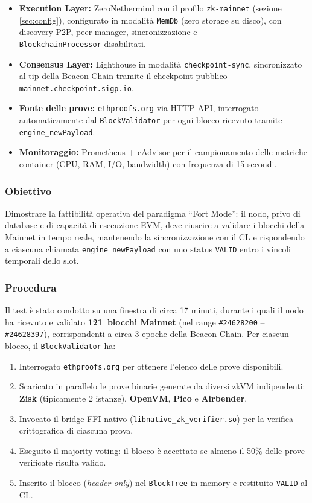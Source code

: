 \documentclass[12pt,a4paper,openright,twoside]{report}
\begin{document}
\begin{itemize}
    \item \textbf{Execution Layer:} ZeroNethermind con il profilo \texttt{zk-mainnet} (sezione \ref{sec:config}), configurato in modalità \texttt{MemDb} (zero storage su disco), con discovery P2P, peer manager, sincronizzazione e \\\texttt{BlockchainProcessor} disabilitati.
    \item \textbf{Consensus Layer:} Lighthouse in modalità \texttt{checkpoint-sync}, sincronizzato al tip della Beacon Chain tramite il checkpoint pubblico \texttt{mainnet.checkpoint.sigp.io}.
    \item \textbf{Fonte delle prove:} \texttt{ethproofs.org} via HTTP API, interrogato automaticamente dal \texttt{BlockValidator} per ogni blocco ricevuto tramite \texttt{engine\_newPayload}.
    \item \textbf{Monitoraggio:} Prometheus\cite{prometheus} + cAdvisor\cite{cAdvisor} per il campionamento delle metriche container (CPU, RAM, I/O, bandwidth) con frequenza di 15 secondi.
\end{itemize}

\subsubsection{Obiettivo}

Dimostrare la fattibilità operativa del paradigma ``Fort Mode'': il nodo, privo di database e di capacità di esecuzione EVM, deve riuscire a validare i blocchi della Mainnet in tempo reale, mantenendo la sincronizzazione con il CL e rispondendo a ciascuna chiamata \texttt{engine\_newPayload} con uno status \texttt{VALID} entro i vincoli temporali dello slot.

\subsubsection{Procedura}

Il test è stato condotto su una finestra di circa 17 minuti, durante i quali il nodo ha ricevuto e validato \textbf{121~blocchi Mainnet} (nel range \texttt{\#24628200} -- \texttt{\#24628397}), corrispondenti a circa 3 epoche della Beacon Chain. Per ciascun blocco, il \texttt{BlockValidator} ha:

\begin{enumerate}
    \item Interrogato \texttt{ethproofs.org} per ottenere l'elenco delle prove disponibili.
    \item Scaricato in parallelo le prove binarie generate da diversi zkVM indipendenti: \textbf{Zisk} (tipicamente 2 istanze), \textbf{OpenVM}, \textbf{Pico} e \textbf{Airbender}.
    \item Invocato il bridge FFI nativo (\texttt{libnative\_zk\_verifier.so}) per la verifica crittografica di ciascuna prova.
    \item Eseguito il majority voting: il blocco è accettato se almeno il 50\% delle prove verificate risulta valido.
    \item Inserito il blocco (\textit{header-only}) nel \texttt{BlockTree} in-memory e restituito \texttt{VALID} al CL.
\end{enumerate}
\end{document}
